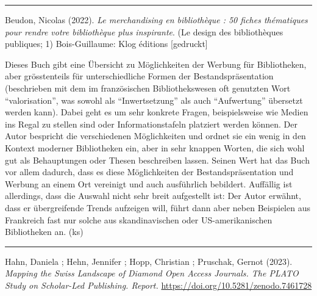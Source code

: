 \documentclass[a4paper,
fontsize=11pt,
oneside,
numbers=noperiodatend,
parskip=half-,
bibliography=totoc,
final
]{scrartcl}
\begin{document}
\begin{center}\rule{0.5\linewidth}{0.5pt}\end{center}

Beudon, Nicolas (2022). \emph{Le merchandising en bibliothèque : 50
fiches thématiques pour rendre votre bibliothèque plus inspirante}. (Le
design des bibliothèques publiques; 1) Bois-Guillaume: Klog éditions
{[}gedruckt{]}

Dieses Buch gibt eine Übersicht zu Möglichkeiten der Werbung für
Bibliotheken, aber grösstenteils für unterschiedliche Formen der
Bestandspräsentation (beschrieben mit dem im französischen
Bibliothekswesen oft genutzten Wort \enquote{valorisation}, was sowohl
als \enquote{Inwertsetzung} als auch \enquote{Aufwertung} übersetzt
werden kann). Dabei geht es um sehr konkrete Fragen, beispielsweise wie
Medien ins Regal zu stellen sind oder Informationstafeln platziert
werden können. Der Autor bespricht die verschiedenen Möglichkeiten und
ordnet sie ein wenig in den Kontext moderner Bibliotheken ein, aber in
sehr knappen Worten, die sich wohl gut als Behauptungen oder Thesen
beschreiben lassen. Seinen Wert hat das Buch vor allem dadurch, dass es
diese Möglichkeiten der Bestandspräsentation und Werbung an einem Ort
vereinigt und auch ausführlich bebildert. Auffällig ist allerdings, dass
die Auswahl nicht sehr breit aufgestellt ist: Der Autor erwähnt, dass er
übergreifende Trends aufzeigen will, führt dann aber neben Beispielen
aus Frankreich fast nur solche aus skandinavischen oder
US-amerikanischen Bibliotheken an. (ks)

\begin{center}\rule{0.5\linewidth}{0.5pt}\end{center}

Hahn, Daniela ; Hehn, Jennifer ; Hopp, Christian ; Pruschak, Gernot
(2023). \emph{Mapping the Swiss Landscape of Diamond Open Access
Journals. The PLATO Study on Scholar-Led Publishing. Report.}
\url{https://doi.org/10.5281/zenodo.7461728}
\end{document}

